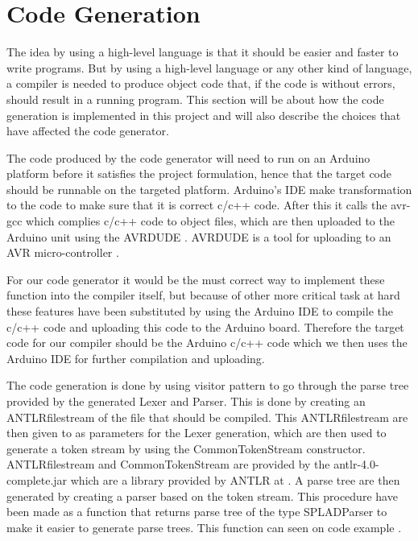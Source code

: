 \section{Code Generation}
The idea by using a high-level language is that it should be easier and faster to write programs. But by using a high-level language or any other kind of language, a compiler is needed to produce object code that, if the code is without errors, should result in a running program. This section will be about how the code generation is implemented in this project and will also describe the choices that have affected the code generator.

The code produced by the code generator will need to run on an Arduino platform before it satisfies the project formulation, hence that the target code should be runnable on the targeted platform. Arduino's IDE make transformation to the code to make sure that it is correct c/c++ code. After this it calls the avr-gcc which complies c/c++ code to object files, which are then uploaded to the Arduino unit using the AVRDUDE . AVRDUDE is a tool for uploading to an AVR micro-controller .

For our code generator it would be the must correct way to implement these function into the compiler itself, but because of other more critical task at hard these features have been substituted by using the Arduino IDE to compile the c/c++ code and uploading this code to the Arduino board. Therefore the target code for our compiler should be the Arduino c/c++ code which we then uses the Arduino IDE for further compilation and uploading.

The code generation is done by using visitor pattern to go through the parse tree provided by the generated Lexer and Parser. This is done by creating an ANTLRfilestream of the file that should be compiled. This ANTLRfilestream are then given to as parameters for the Lexer generation, which are then used to generate a token stream by using the CommonTokenStream constructor. ANTLRfilestream and CommonTokenStream are provided by the antlr-4.0-complete.jar which are a library provided by ANTLR at . A parse tree are then generated by creating a parser based on the token stream. This procedure have been made as a function that returns parse tree of the type SPLADParser to make it easier to generate parse trees. This function can seen on code example .

